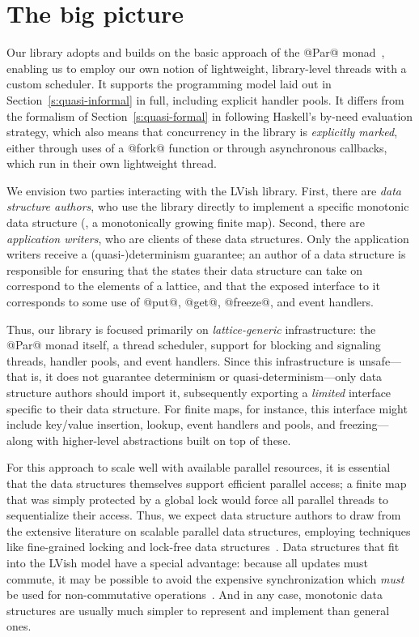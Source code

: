 \section{The big picture}\label{s:lvish-big-picture}

Our library adopts and builds on the basic approach of the @Par@
monad~\cite{monad-par, marlow-book}, enabling us to employ our own
notion of lightweight, library-level threads with a custom scheduler.
It supports the programming model laid out in
Section~\ref{s:quasi-informal} in full, including explicit handler
pools.  It differs from the formalism of Section~\ref{s:quasi-formal}
in following Haskell's by-need evaluation strategy, which also means
that concurrency in the library is \emph{explicitly marked}, either
through uses of a @fork@ function or through asynchronous callbacks,
which run in their own lightweight thread.

We envision two parties interacting with the LVish library.  First,
there are \emph{data structure authors}, who use the library directly
to implement a specific monotonic data structure (\eg, a monotonically
growing finite map).  Second, there are \emph{application writers},
who are clients of these data structures.  Only the application
writers receive a \mbox{(quasi-)determinism} guarantee; an author of a
data structure is responsible for ensuring that the states their data
structure can take on correspond to the elements of a lattice, and
that the exposed interface to it corresponds to some use of @put@,
@get@, @freeze@, and event handlers.

Thus, our library is focused primarily on \emph{lattice-generic}
infrastructure: the @Par@ monad itself, a thread scheduler, support
for blocking and signaling threads, handler pools, and event handlers.
Since this infrastructure is unsafe---that is, it does not guarantee
determinism or quasi-determinism---only data structure authors should
import it, subsequently exporting a \emph{limited} interface specific
to their data structure.  For finite maps, for instance, this
interface might include key/value insertion, lookup, event handlers
and pools, and freezing---along with higher-level abstractions built
on top of these.

For this approach to scale well with available parallel resources, it
is essential that the data structures themselves support efficient
parallel access; a finite map that was simply protected by a global
lock would force all parallel threads to sequentialize their access.
Thus, we expect data structure authors to draw from the extensive
literature on scalable parallel data structures, employing techniques
like fine-grained locking and lock-free data structures~\cite{art}.
Data structures that fit into the LVish model have a special
advantage: because all updates must commute, it may be possible to
avoid the expensive synchronization which \emph{must} be used for
non-commutative operations~\cite{lawsOfOrder}.  And in any case,
monotonic data structures are usually much simpler to represent and
implement than general ones. 
